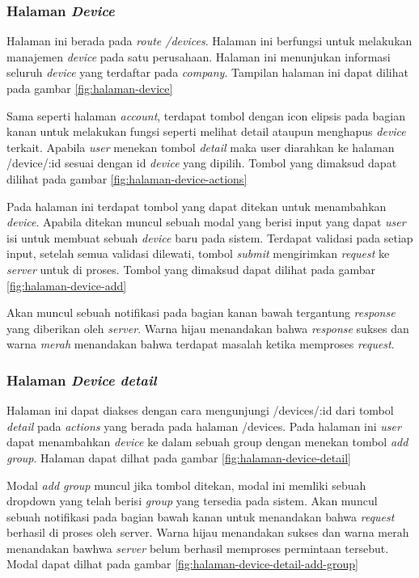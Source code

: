 \subsubsection{Halaman \textit{Device}}
Halaman ini berada pada \textit{route /devices}. Halaman ini berfungsi untuk melakukan manajemen \textit{device} pada satu perusahaan. Halaman ini menunjukan informasi seluruh \textit{device} yang terdaftar pada \textit{company}. Tampilan halaman ini dapat dilihat pada gambar \ref{fig:halaman-device}

Sama seperti halaman \textit{account}, terdapat tombol dengan icon elipsis pada bagian kanan untuk melakukan fungsi seperti melihat detail ataupun menghapus \textit{device} terkait. Apabila \textit{user} menekan tombol \textit{detail} maka user diarahkan ke halaman /device/:id sesuai dengan id \textit{device} yang dipilih. Tombol yang dimaksud dapat dilihat pada gambar \ref{fig:halaman-device-actions}

Pada halaman ini terdapat tombol yang dapat ditekan untuk menambahkan \textit{device}. Apabila ditekan muncul sebuah modal yang berisi input yang dapat \textit{user} isi untuk membuat sebuah \textit{device} baru pada sistem. Terdapat validasi pada setiap input, setelah semua validasi dilewati, tombol \textit{submit} mengirimkan \textit{request} ke \textit{server} untuk di proses. Tombol yang dimaksud dapat dilihat pada gambar \ref{fig:halaman-device-add}

Akan muncul sebuah notifikasi pada bagian kanan bawah tergantung \textit{response} yang diberikan oleh \textit{server}. Warna hijau menandakan bahwa \textit{response} sukses dan warna \textit{merah} menandakan bahwa terdapat masalah ketika memproses \textit{request}.

\subsubsection{Halaman \textit{Device detail}}
Halaman ini dapat diakses dengan cara mengunjungi /devices/:id dari tombol \textit{detail} pada \textit{actions} yang berada pada halaman /devices. Pada halaman ini \textit{user} dapat menambahkan \textit{device} ke dalam sebuah group dengan menekan tombol \textit{add group}. Halaman dapat dilhat pada gambar \ref{fig:halaman-device-detail}

Modal \textit{add group} muncul jika tombol ditekan, modal ini memliki sebuah dropdown yang telah berisi \textit{group} yang tersedia pada sistem. Akan muncul sebuah notifikasi pada bagian bawah kanan untuk menandakan bahwa \textit{request} berhasil di proses oleh server. Warna hijau menandakan sukses dan warna merah menandakan bawhwa \textit{server} belum berhasil memproses permintaan tersebut. Modal dapat dilhat pada gambar \ref{fig:halaman-device-detail-add-group}

